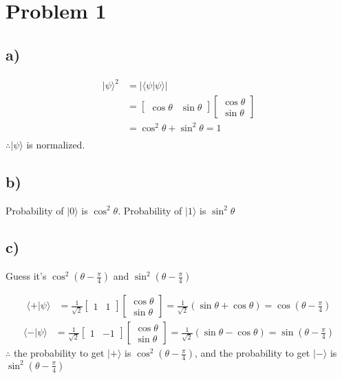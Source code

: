 \section*{Problem 1}
\subsection*{a)}
\begin{align*}
|\psi\rangle^2 &= |\langle \psi|\psi\rangle| \\
&= \begin{bmatrix}
        \cos\theta & \sin\theta
    \end{bmatrix} 
    \begin{bmatrix}
        \cos\theta \\
        \sin\theta
    \end{bmatrix} \\
    &= \cos^2\theta + \sin^2\theta = 1 \\
\end{align*}
$\therefore |\psi\rangle$ is normalized.

\subsection*{b)}
Probability of $|0\rangle$ is $\cos^2\theta$. Probability of $|1\rangle$ is $\sin^2\theta$

\subsection*{c)}
Guess it's $\cos^2(\theta - \frac{\pi}{4})$ and $\sin^2(\theta - \frac{\pi}{4})$

\begin{align*}
    \langle+|\psi\rangle &= \frac{1}{\sqrt{2}}\begin{bmatrix}
        1 & 1
    \end{bmatrix}
    \begin{bmatrix}
        \cos\theta \\
        \sin\theta
    \end{bmatrix} = \frac{1}{\sqrt{2}}(\sin\theta + \cos\theta)
    = \cos(\theta - \frac{\pi}{4})
\end{align*}
\begin{align*}
    \langle-|\psi\rangle &= \frac{1}{\sqrt{2}}\begin{bmatrix}
        1 & -1
    \end{bmatrix}
    \begin{bmatrix}
        \cos\theta \\
        \sin\theta
    \end{bmatrix} = \frac{1}{\sqrt{2}}(\sin\theta - \cos\theta)
    = \sin(\theta - \frac{\pi}{4})
\end{align*}
$\therefore$ the probability to get $|+\rangle$ is $\cos^2(\theta - \frac{\pi}{4})$, and the probability to get $|-\rangle$ is $\sin^2(\theta - \frac{\pi}{4})$


